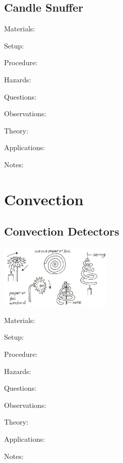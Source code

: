 \begin{multicols}{2}
\subsection{Candle Snuffer}


\begin{description*}
\item[Materials:]{}
\item[Setup:]{}
\item[Procedure:]{}
\item[Hazards:]{}
\item[Questions:]{}
\item[Observations:]{}
\item[Theory:]{}
\item[Applications:]{}
\item[Notes:]{}
\end{description*}


\section*{Convection}


\subsection{Convection Detectors}

\begin{center}
\includegraphics[width=0.4\textwidth]{./img/vso/convection-detectors.png}
\end{center}

\begin{description*}
\item[Materials:]{}
\item[Setup:]{}
\item[Procedure:]{}
\item[Hazards:]{}
\item[Questions:]{}
\item[Observations:]{}
\item[Theory:]{}
\item[Applications:]{}
\item[Notes:]{}
\end{description*}



\end{multicols}
